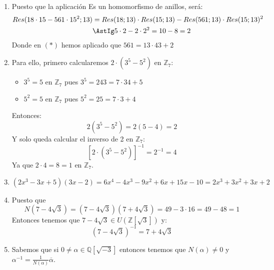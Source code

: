 \documentclass[12pt]{article}
\begin{document}
\begin{ejercicio}[4 puntos]
        \begin{enumerate}[label=(\alph*)]
            \item Puesto que la aplicación 
                Es un homomorfismo de anillos, será:
                \begin{align*}
                    Res(18\cdot 15-561\cdot 15^2; 13) &= Res(18;13)\cdot Res(15;13) - Res(561;13)\cdot Res(15;13)^2 \\
                                                      &\AstIg 5\cdot 2-2\cdot 2^2 = 10 -8 = 2
                \end{align*}
                Donde en $(\ast)$ hemos aplicado que $561=13\cdot 43+2$
            \item Para ello, primero calcularemos $2\cdot (3^5 - 5^2)$ en $\mathbb{Z}_7$:
                \begin{itemize}
                    \item $3^5 = 5$ en $\mathbb{Z}_7$ pues $3^5 = 243 = 7\cdot 34+5$ 
                    \item $5^2 = 5$ en $\mathbb{Z}_7$ pues $5^2 = 25 = 7\cdot 3 + 4$
                \end{itemize}
                Entonces:
                \begin{equation*}
                    2(3^5 - 5^2) = 2(5-4) = 2
                \end{equation*}
                Y solo queda calcular el inverso de 2 en $\mathbb{Z}_7$:
                \begin{equation*}
                    {[2\cdot (3^5-5^2)]}^{-1} = 2^{-1} = 4
                \end{equation*}
                Ya que $2\cdot 4 = 8 = 1$ en $\mathbb{Z}_7$.
            \item $(2x^3-3x+5)(3x-2) = 6x^4-4x^3-9x^2+6x+15x-10 = 2x^3+3x^2+3x+2$
            \item Puesto que
                \begin{equation*}
                    N(7-4\sqrt{3}) = (7-4\sqrt{3})(7+4\sqrt{3}) = 49 - 3\cdot 16 = 49-48 = 1
                \end{equation*}
                Entonces tenemos que $7-4\sqrt{3}\in U(\mathbb{Z}[\sqrt{3}])$ y:
                \begin{equation*}
                    {(7-4\sqrt{3})}^{-1} = 7+4\sqrt{3}
                \end{equation*}
            \item Sabemos que si $0\neq \alpha\in \mathbb{Q}[\sqrt{-3}]$ entonces tenemos que $N(\alpha)\neq 0$ y\newline $\alpha^{-1} = \frac{1}{N(\alpha)}\overline{\alpha}$.


\end{enumerate}
\end{ejercicio}
\end{document}
